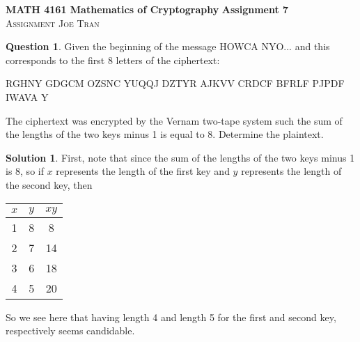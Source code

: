 \documentclass[11pt]{article}
\theoremstyle{definition}\newtheorem{definition}{Definition}
\theoremstyle{definition}\newtheorem{question}{Question}
\theoremstyle{definition}\newtheorem*{solution}{Solution}
\begin{document}
\noindent \textbf{MATH 4161 Mathematics of Cryptography} \hfill \textbf{Assignment 7} \\
\noindent \textsc{Assignment} \hfill \textsc{Joe Tran}

\begin{question}
    Given the beginning of the message \textsf{HOWCA NYO...} and this corresponds to the first 8 letters of the ciphertext:
    \begin{center}
        \textsf{RGHNY GDGCM OZSNC YUQQJ DZTYR AJKVV CRDCF BFRLF PJPDF IWAVA Y}
    \end{center}
    The ciphertext was encrypted by the Vernam two-tape system such the sum of the lengths of the two keys minus 1 is equal to 8. Determine the plaintext.
\end{question}

\begin{solution}
    First, note that since the sum of the lengths of the two keys minus 1 is 8, so if $x$ represents the length of the first key and $y$ represents the length of the second key, then
    \begin{center}
        \begin{tabular}{|c|c|c|}
            \hline
            $x$ & $y$ & $xy$ \\ \hline
            1   & 8   & 8    \\ \hline
            2   & 7   & 14   \\ \hline
            3   & 6   & 18   \\ \hline
            4   & 5   & 20   \\ \hline
            \end{tabular}
    \end{center}
    So we see here that having length 4 and length 5 for the first and second key, respectively seems candidable.


\end{solution}
\end{document}
